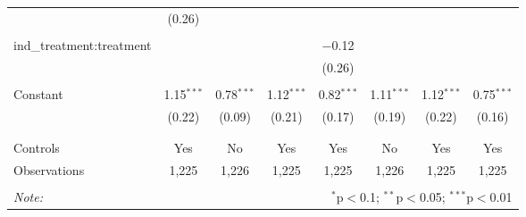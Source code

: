 \begin{table}[!htbp]
\begin{tabular}{@{\extracolsep{5pt}}lccccccc}
  & (0.26) &  &  &  &  &  &  \\ 
  & & & & & & & \\ 
 ind\_treatment:treatment &  &  &  & $-$0.12 &  &  &  \\ 
  &  &  &  & (0.26) &  &  &  \\ 
  & & & & & & & \\ 
 Constant & 1.15$^{***}$ & 0.78$^{***}$ & 1.12$^{***}$ & 0.82$^{***}$ & 1.11$^{***}$ & 1.12$^{***}$ & 0.75$^{***}$ \\ 
  & (0.22) & (0.09) & (0.21) & (0.17) & (0.19) & (0.22) & (0.16) \\ 
  & & & & & & & \\ 
\hline \\[-1.8ex] 
Controls & Yes & No & Yes & Yes & No & Yes & Yes \\ 
Observations & 1,225 & 1,226 & 1,225 & 1,225 & 1,226 & 1,225 & 1,225 \\ 
\hline 
\hline \\[-1.8ex] 
\textit{Note:}  & \multicolumn{7}{r}{$^{*}$p$<$0.1; $^{**}$p$<$0.05; $^{***}$p$<$0.01} \\ 
\end{tabular} 
\end{table} 
